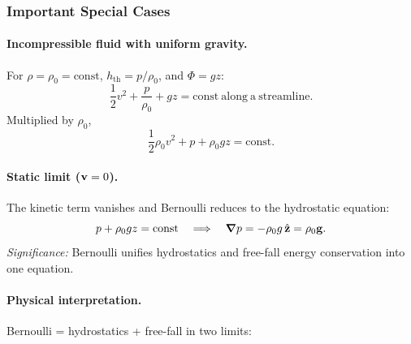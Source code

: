 \documentclass[../main.tex]{subfiles}
\begin{document}
\subsubsection{Important Special Cases}

\paragraph{Incompressible fluid with uniform gravity.}
For $\rho=\rho_0=\mathrm{const}$, $h_{\mathrm{th}}=p/\rho_0$, and $\Phi=gz$:
\begin{equation}
  \boxed{\frac{1}{2}v^2 + \frac{p}{\rho_0} + gz = \mathrm{const\ along\ a\ streamline}.}
  \label{eq:lec13_bernoulli_incompressible}
\end{equation}
Multiplied by $\rho_0$,
\begin{equation}
  \boxed{\frac{1}{2}\rho_0 v^2 + p + \rho_0 gz = \mathrm{const.}}
  \label{eq:lec13_bernoulli_pressure_form}
\end{equation}

\paragraph{Static limit ($\mathbf{v}=0$).}
The kinetic term vanishes and Bernoulli reduces to the hydrostatic equation:
\begin{equation}
  p + \rho_0 gz = \mathrm{const} \quad\Longrightarrow\quad \grad p = -\rho_0 g\,\hat{\mathbf{z}} = \rho_0\mathbf{g}.
\end{equation}
\textit{Significance:} Bernoulli unifies hydrostatics and free-fall energy conservation into one equation.

\paragraph{Physical interpretation.}
Bernoulli = hydrostatics + free-fall in two limits:
\begin{center}
\end{center}
\end{document}
